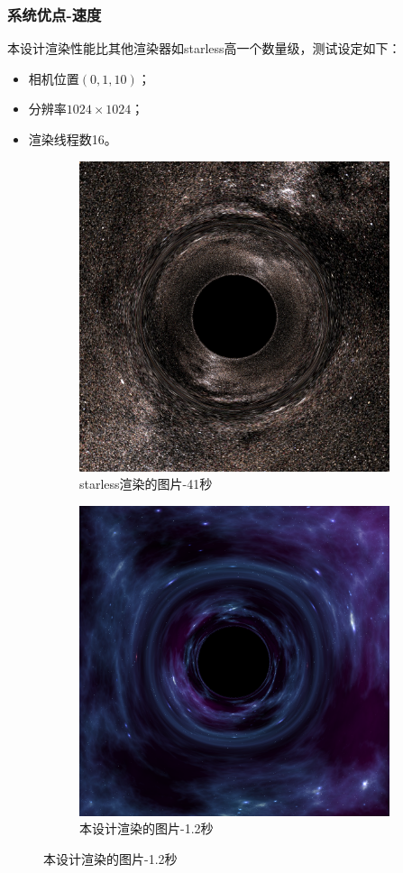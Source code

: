 \documentclass{beamer}
\begin{document}
\begin{frame}
    \frametitle{系统优点-速度}
    本设计渲染性能比其他渲染器如starless高一个数量级，测试设定如下：
    \begin{itemize}
        \item 相机位置$(0, 1, 10)$；
        \item 分辨率$1024\times1024$；
        \item 渲染线程数16。
    \end{itemize}
    \begin{figure}[H]
        \centering
        \begin{subfigure}{.45\textwidth}
            \centering
            \includegraphics[width=.8\linewidth]{images/starless_test.png}
            \caption{starless渲染的图片-41秒}
            \label{fig:starless_test}
        \end{subfigure}%
        \begin{subfigure}{.45\textwidth}
            \centering
            \includegraphics[width=.8\linewidth]{images/blackness_test.png}
            \caption{本设计渲染的图片-1.2秒}
            \label{fig:blackness_test}
        \end{subfigure}
    \end{figure}


\end{frame}
\end{document}
